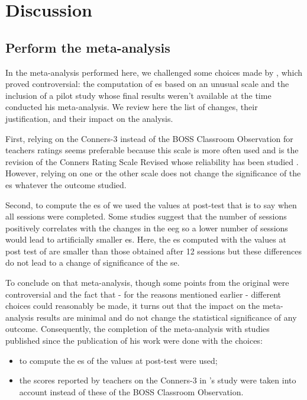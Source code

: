 


\section{Discussion}

\subsection{Perform the meta-analysis}
In the meta-analysis performed here, we challenged some choices made by \citeauthor{Cortese2016}, 
which proved controversial: the computation of \gls{es} based on an unusual scale \citep{Steiner2014} and the inclusion 
of a pilot study \citep{Arnold2014} whose final results weren't available at the time \citeauthor{Cortese2016} 
conducted his meta-analysis. We review here the list of changes, their justification, and their impact on the analysis.
 
First, relying on the Conners-3 \citep{Conners2008} instead of the BOSS Classroom Observation \citep{Shapiro2010} 
for teachers ratings seems preferable because this scale is more often used \citep{Christiansen2014, 
Bluschke2016} and is the revision of the Conners Rating Scale Revised \citep{Conners1998} whose reliability has been studied 
\citep{Collett2003}. However, relying on one or the other scale does not 
change the significance of the \gls{es} whatever the outcome studied.

Second, to compute the \gls{es} of \citet{Arnold2014} we used the values at post-test
that is to say when all sessions were completed. Some studies suggest that the number of sessions positively 
correlates with the changes in the \gls{eeg} \citep{Vernon2004} so a lower number of sessions would lead to 
artificially smaller \gls{es}. Here, the \gls{es} computed with the values at post test of \citet{Arnold2014} 
are smaller than those obtained after 12 sessions but these differences do not lead to a change of significance 
of the \gls{se}. 

To conclude on that meta-analysis, though some points from the original were controversial and the fact that 
- for the reasons mentioned earlier - different choices could reasonably be made, 
it turns out that the impact on the meta-analysis results are minimal and do not change the statistical significance of any outcome. 
Consequently, the completion of the meta-analysis with studies published since the publication of his work were done with the choices: 
\begin{itemize} 
	\item to compute the \gls{es} of \citet{Arnold2014} the values at post-test were used;
	\item the scores reported by teachers on the Conners-3 in \citeauthor{Steiner2014}'s study were taken into account instead of these of 
	the BOSS Classroom Observation.
\end{itemize} 

